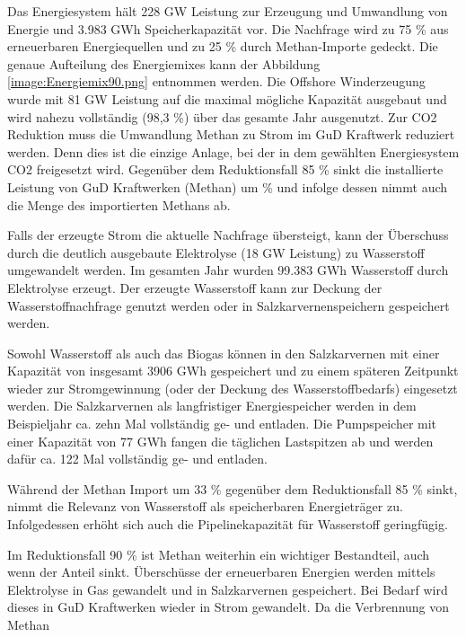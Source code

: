 Das Energiesystem hält 228 GW Leistung zur Erzeugung und Umwandlung von Energie und 3.983 GWh Speicherkapazität vor. Die Nachfrage wird zu 75 \% aus erneuerbaren Energiequellen und zu 25 \% durch Methan-Importe gedeckt. Die genaue Aufteilung des Energiemixes kann der Abbildung \ref{image:Energiemix90.png} entnommen werden. Die Offshore Winderzeugung wurde mit 81 GW Leistung auf die maximal mögliche Kapazität ausgebaut und wird nahezu vollständig (98,3 \%) über das gesamte Jahr ausgenutzt. 
Zur CO2 Reduktion muss die Umwandlung Methan zu Strom im GuD Kraftwerk reduziert werden. Denn dies ist die einzige Anlage, bei der in dem gewählten Energiesystem CO2 freigesetzt wird. Gegenüber dem Reduktionsfall 85 \% sinkt die installierte Leistung von GuD Kraftwerken (Methan) um  \% und infolge dessen nimmt auch die Menge des importierten Methans ab.


Falls der erzeugte Strom die aktuelle Nachfrage übersteigt, kann der Überschuss durch die deutlich ausgebaute Elektrolyse (18 GW Leistung) zu Wasserstoff umgewandelt werden. Im gesamten Jahr wurden 99.383 GWh Wasserstoff durch Elektrolyse erzeugt. Der erzeugte Wasserstoff kann zur Deckung der Wasserstoffnachfrage genutzt werden oder in Salzkarvernenspeichern gespeichert werden. 

Sowohl Wasserstoff als auch das Biogas können in den Salzkarvernen mit einer Kapazität von insgesamt 3906 GWh gespeichert und zu einem späteren Zeitpunkt wieder zur Stromgewinnung (oder der Deckung des Wasserstoffbedarfs) eingesetzt werden. Die Salzkarvernen als langfristiger Energiespeicher werden in dem Beispieljahr ca. zehn Mal vollständig ge- und entladen. Die Pumpspeicher mit einer Kapazität von 77 GWh fangen die täglichen Lastspitzen ab und werden dafür ca. 122 Mal vollständig ge- und entladen.

Während der Methan Import um 33 \% gegenüber dem Reduktionsfall 85 \% sinkt, nimmt die Relevanz von Wasserstoff als speicherbaren Energieträger zu. Infolgedessen erhöht sich auch die Pipelinekapazität für Wasserstoff geringfügig. 

Im Reduktionsfall 90 \% ist Methan weiterhin ein wichtiger Bestandteil, auch wenn der Anteil sinkt. Überschüsse der erneuerbaren Energien werden mittels Elektrolyse in Gas gewandelt und in Salzkarvernen gespeichert. Bei Bedarf wird dieses in GuD Kraftwerken wieder in Strom gewandelt. Da die Verbrennung von Methan


